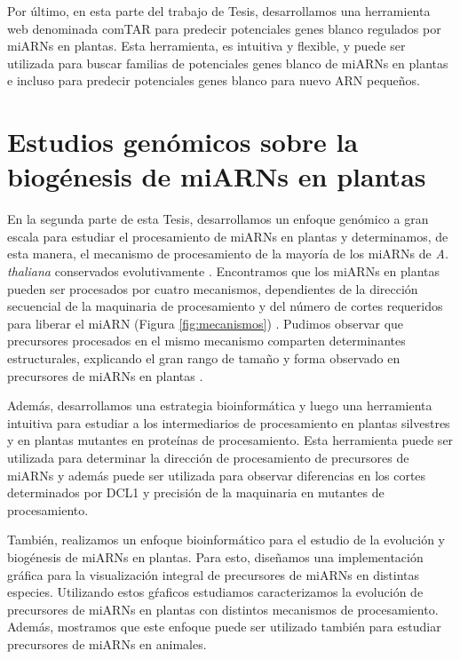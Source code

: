 Por último, en esta parte del trabajo de Tesis, desarrollamos una herramienta web denominada comTAR para predecir potenciales genes blanco regulados por miARNs en plantas. 
Esta herramienta, es intuitiva y flexible, y puede ser utilizada para buscar familias de potenciales genes blanco de miARNs en plantas e incluso para predecir potenciales genes blanco para nuevo ARN pequeños.

\section{Estudios genómicos sobre la biogénesis de miARNs en plantas}

En la segunda parte de esta Tesis, desarrollamos un enfoque genómico a gran escala para estudiar el procesamiento de miARNs en plantas y determinamos, de esta manera, el mecanismo de procesamiento de la mayoría de los miARNs de \textit{A. thaliana} conservados evolutivamente \citep{Bologna2013}.
Encontramos que los miARNs en plantas pueden ser procesados por cuatro mecanismos, dependientes de la dirección secuencial de la maquinaria de procesamiento y del número de cortes requeridos para liberar el miARN (Figura \ref{fig:mecanismos}) \citep{Bologna2013}.
Pudimos observar que precursores procesados en el mismo mecanismo comparten determinantes estructurales, explicando el gran rango de tamaño y forma observado en precursores de miARNs en plantas \citep{Bologna2013}.

Además, desarrollamos una estrategia bioinformática y luego una herramienta intuitiva para estudiar a los intermediarios de procesamiento en plantas silvestres y en plantas mutantes en proteínas de procesamiento.
Esta herramienta puede ser utilizada para determinar la dirección de procesamiento de precursores de miARNs y además puede ser utilizada para observar diferencias en los cortes determinados por DCL1 y precisión de la maquinaria en mutantes de procesamiento.

También, realizamos un enfoque bioinformático para el estudio de la evolución y biogénesis de miARNs en plantas.
Para esto, diseñamos una implementación gráfica para la visualización integral de precursores de miARNs en distintas especies.
Utilizando estos gŕaficos estudiamos caracterizamos la evolución de precursores de miARNs en plantas con distintos mecanismos de procesamiento.
Además, mostramos que este enfoque puede ser utilizado también para estudiar precursores de miARNs en animales.
